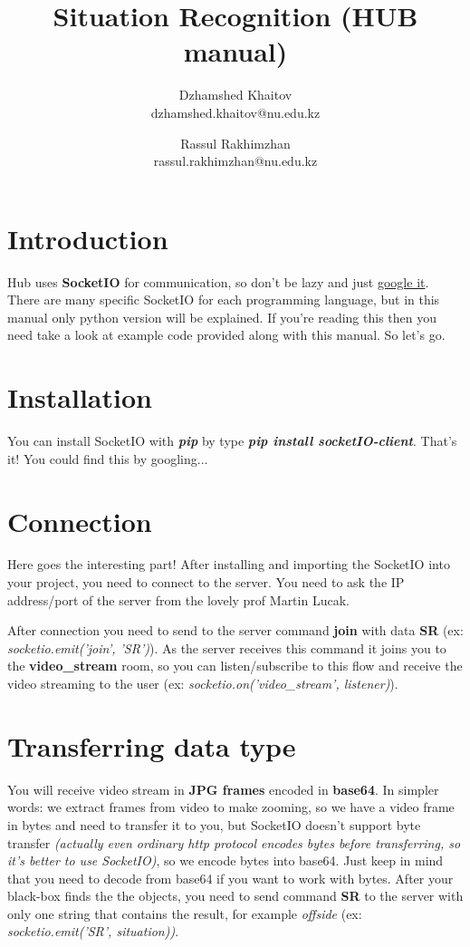 \documentclass[10pt]{article}
\title {
	Situation Recognition (HUB manual)
}
\date {}
\author {
	Dzhamshed Khaitov\\
	dzhamshed.khaitov@nu.edu.kz
	\and
	Rassul Rakhimzhan\\
	rassul.rakhimzhan@nu.edu.kz
}
\begin{document}
		
\maketitle

\section{Introduction}

Hub uses \textbf{SocketIO} for communication, so don't be lazy and just \href{http://www.justfuckinggoogleit.com/search/socketio}{google it}. There are many specific SocketIO for each programming language, but in this manual only python version will be explained. If you're reading this then you need take a look at example code provided along with this manual. So let's go.

\section{Installation}
You can install SocketIO with \textbf{\textit{pip}} by type \textbf{\textit{pip install socketIO-client}}. That's it! You could find this by googling...

\section{Connection}
Here goes the interesting part! After installing and importing the SocketIO into your project, you need to connect to the server. You need to ask the IP address/port of the server from the lovely prof Martin Lucak.
\par
After connection you need to send to the server command \textbf{join} with data \textbf{SR} (ex: \textit{socketio.emit('join', 'SR')}). As the server receives this command it joins you to the \textbf{video\_stream} room, so you can listen/subscribe to this flow and receive the video streaming to the user (ex: \textit{socketio.on('video\_stream', listener)}).

\section{Transferring data type}
You will receive video stream in \textbf{JPG frames} encoded in \textbf{base64}. In simpler words: we extract frames from video to make zooming, so we have a video frame in bytes and need to transfer it to you, but SocketIO doesn't support byte transfer \textit{(actually even ordinary http protocol encodes bytes before transferring, so it's better to use SocketIO)}, so we encode bytes into base64. Just keep in mind that you need to decode from base64 if you want to work with bytes.
After your black-box finds the the objects, you need to send command \textbf{SR} to the server with only one string that contains the result, for example \textit{offside} (ex: \textit{socketio.emit('SR', situation))}.
\end{document}
